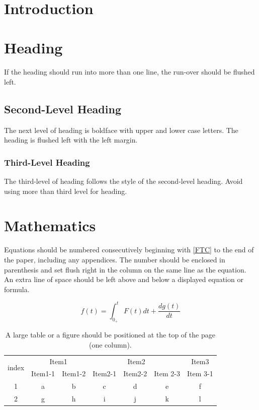 \documentclass{article}
\title{     }
\author{     }
\date{     }
\begin{document}
\section{Introduction}


\section{Heading}
If the heading should run into more than one line, the run-over should be flushed left.
\subsection{Second-Level Heading}
The next level of heading is boldface with upper and lower case letters. The heading is flushed left with the left margin. 

\subsubsection{Third-Level Heading}
The third-level of heading follows the style of the second-level heading. Avoid using more than third level for heading.


\section{Mathematics}
Equations should be numbered consecutively beginning with \cref{FTC} to the end of the paper, including any appendices. The number should be enclosed in parenthesis and set flush right in the column on the same line as the equation. An extra line of space should be left above and below a displayed equation or formula. 

\begin{equation}
f(t)= \int_{0_+}^t F(t)dt + \frac{dg(t)}{dt} \label{FTC}
\end{equation}
\begin{table}[t]
\centering
\caption{A large table or a figure should be positioned at the top of the page (one column).}
\begin{tabular}{c || c | c | c | c | c | c}
\hline
\multirow{2}{*}{index} & \multicolumn{2}{c|}{Item1}&\multicolumn{3}{c|}{Item2} & Item3 \\ \cline{2-7}
& Item1-1 & Item1-2 & Item2-1 & Item2-2 & Item 2-3 & Item 3-1 \\ \hline \hline 
1 & a & b & c & d & e & f \\ \hline
2 & g & h & i & j & k & l \\ \hline
\end{tabular}
\end{table}
\end{document}
